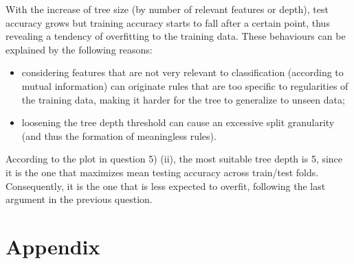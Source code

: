 \documentclass{exam}
\begin{document}
\begin{questions}
\begin{parts}
\begin{figure}[H]
            \end{figure}
        \end{parts}
        \item With the increase of tree size (by number of relevant features or depth), test accuracy grows but training accuracy starts to fall after a certain point, thus revealing a tendency of overfitting to the training data. These behaviours can be explained by the following reasons:
        \vspace{-0.5em}
        \begin{itemize}
            \item considering features that are not very relevant to classification (according to mutual information) can originate rules that are too specific to regularities of the training data, making it harder for the tree to generalize to unseen data;
            \item loosening the tree depth threshold  can cause an excessive split granularity (and thus the formation of meaningless rules).
        \end{itemize}
        \item According to the plot in question 5) (ii), the most suitable tree depth is 5, since it is the one that maximizes mean testing accuracy across train/test folds. Consequently, it is the one that is less expected to overfit, following the last argument in the previous question. 
    \end{questions}
    \pagebreak
    \section{Appendix}
    \inputminted{python}{src/ex02.py}
    
    
\end{document}
